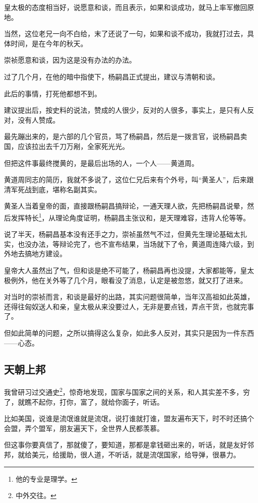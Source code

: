 \begin{multicols}{\theparacolNo}
		皇太极的态度相当好，说愿意和谈，而且表示，如果和谈成功，就马上率军撤回原地。

		当然，这位老兄一向不白给，末了还说了一句，如果和谈不成功，我就打过去，具体时间，是在今年的秋天。

		崇祯愿意和谈，因为这是没有办法的办法。

		过了几个月，在他的暗中指使下，杨嗣昌正式提出，建议与清朝和谈。

		此后的事情，打死他都想不到。

		建议提出后，按史料的说法，赞成的人很少，反对的人很多，事实上，是只有人反对，没有人赞成。

		最先蹦出来的，是六部的几个官员，骂了杨嗣昌，然后是一拨言官，说杨嗣昌卖国，应该拉出去千刀万剐，全家死光光。

		但把这件事最终搅黄的，是最后出场的人，一个人——黄道周。

		黄道周同志的简历，我就不多说了，这位仁兄后来有个外号，叫“黄圣人”，后来跟清军死战到底，堪称名副其实。

		黄圣人当着皇帝的面，直接跟杨嗣昌搞辩论，一通天理人欲，先把杨嗣昌说晕，然后发挥特长\footnote{他的专业是理学。}，从理论角度证明，杨嗣昌主张议和，是天理难容，违背人伦等等。

		说了半天，杨嗣昌基本没有还手之力，崇祯虽然气不过，但黄先生理论基础太扎实，也没办法，等辩论完了，也不宣布结果，当场就下了令，黄道周连降六级，到外地去搞地方建设。

		皇帝大人虽然出了气，但和谈是绝不可能了，杨嗣昌再也没提，大家都能等，皇太极例外，他在关外等了几个月，眼看没了消息，认定是被忽悠，就又打了进来。

		对当时的崇祯而言，和谈是最好的出路，其实问题很简单，当年汉高祖如此英雄，还得往匈奴送人和亲，皇太极从来没要过人，无非是要点钱，弄点干货，也就完事了。

		但如此简单的问题，之所以搞得这么复杂，如此多人反对，其实只是因为一件东西——心态。

		\subsection{天朝上邦}
		我曾研习过交通史\footnote{中外交往。}，惊奇地发现，国家与国家之间的关系，和人其实差不多，穷了，就瞧不起你，打你，富了，就给你面子，听话。

		比如美国，说谁是流氓谁就是流氓，说打谁就打谁，盟友遍布天下，时不时还搞个会盟，弄个盟军，朋友遍天下，全世界人民都羡慕。

		但这事你要真信了，那就傻了，要知道，那都是拿钱砸出来的，听话，就是友好邻邦，就给美元，给援助，很人道，不听话，就是流氓国家，给导弹，很暴力。


\end{multicols}
